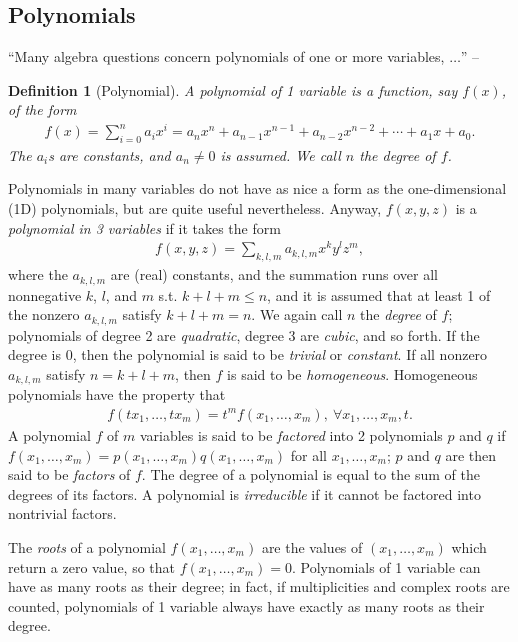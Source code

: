 \documentclass{article}
\numberwithin{equation}{section}
\newtheorem{definition}{Definition}[section]
\begin{document}
\subsection{Polynomials}
``Many algebra questions concern polynomials of one or more variables, $\ldots$'' -- \cite[p. 41]{Tao2006}

\begin{definition}[Polynomial]
	A \emph{polynomial of 1 variable} is a function, say $f(x)$, of the form
	\begin{align}
		f(x) = \sum_{i=0}^n a_ix^i = a_nx^n + a_{n-1}x^{n-1} + a_{n-2}x^{n-2} + \cdots + a_1x + a_0.
	\end{align}
	The $a_i$s are constants, and $a_n\ne 0$ is assumed. We call $n$ the \emph{degree} of $f$.
\end{definition}
Polynomials in many variables do not have as nice a form as the one-dimensional (1D) polynomials, but are quite useful nevertheless. Anyway, $f(x,y,z)$ is a \emph{polynomial in 3 variables} if it takes the form
\begin{align}
	f(x,y,z) = \sum_{k,l,m} a_{k,l,m}x^ky^lz^m,
\end{align}
where the $a_{k,l,m}$ are (real) constants, and the summation runs over all nonnegative $k$, $l$, and $m$ s.t. $k + l + m\le n$, and it is assumed that at least 1 of the nonzero $a_{k,l,m}$ satisfy $k + l + m = n$. We again call $n$ the \emph{degree} of $f$; polynomials of degree 2 are \textit{quadratic}, degree 3 are \emph{cubic}, and so forth. If the degree is 0, then the polynomial is said to be \emph{trivial} or \emph{constant}. If all nonzero $a_{k,l,m}$ satisfy $n = k + l + m$, then $f$ is said to be \emph{homogeneous}. Homogeneous polynomials have the property that
\begin{align}
	f(tx_1,\ldots,tx_m) = t^mf(x_1,\ldots,x_m),\ \forall x_1,\ldots,x_m,t.
\end{align}
A polynomial $f$ of $m$ variables is said to be \emph{factored} into 2 polynomials $p$ and $q$ if $f(x_1,\ldots,x_m) = p(x_1,\ldots,x_m)q(x_1,\ldots,x_m)$ for all $x_1,\ldots,x_m$; $p$ and $q$ are then said to be \emph{factors} of $f$. The degree of a polynomial is equal to the sum of the degrees of its factors. A polynomial is \emph{irreducible} if it cannot be factored into nontrivial factors.

The \emph{roots} of a polynomial $f(x_1,\ldots,x_m)$ are the values of $(x_1,\ldots,x_m)$ which return a zero value, so that $f(x_1,\ldots,x_m) = 0$. Polynomials of 1 variable can have as many roots as their degree; in fact, if multiplicities and complex roots are counted, polynomials of 1 variable always have exactly as many roots as their degree.
\end{document}
